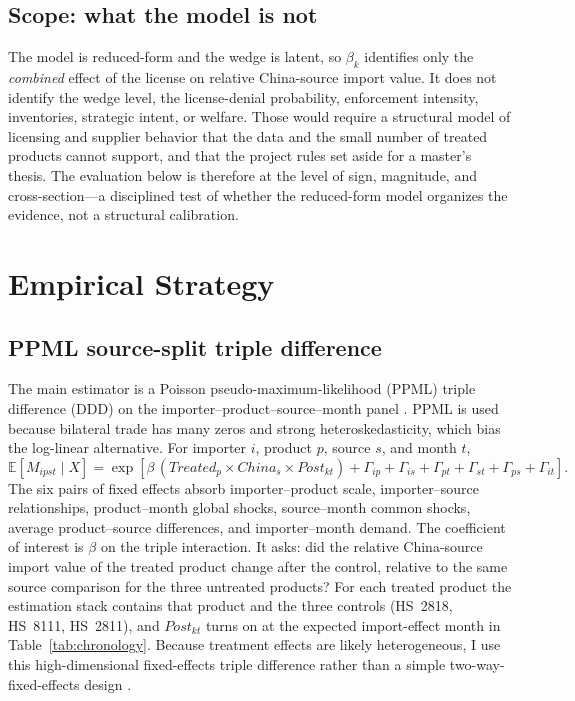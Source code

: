 \documentclass[12pt,a4paper]{article}
\begin{document}
\subsection{Scope: what the model is not}\label{sec:scope}

The model is reduced-form and the wedge is latent, so $\beta_k$ identifies only
the \emph{combined} effect of the license on relative China-source import value. It does not
identify the wedge level, the license-denial probability, enforcement intensity,
inventories, strategic intent, or welfare. Those would require a structural model
of licensing and supplier behavior that the data and the small number of treated
products cannot support, and that the project rules set aside for a master's
thesis. The evaluation below is therefore at the level of sign, magnitude, and
cross-section---a disciplined test of whether the reduced-form model organizes
the evidence, not a structural calibration.

\section{Empirical Strategy}\label{sec:strategy}

\subsection{PPML source-split triple difference}\label{sec:ddd}

The main estimator is a Poisson pseudo-maximum-likelihood (PPML) triple
difference (DDD) on the importer--product--source--month panel
\citep{santossilva2006gravity}. PPML is used because bilateral trade has many
zeros and strong heteroskedasticity, which bias the log-linear alternative. For
importer $i$, product $p$, source $s$, and month $t$,
\begin{equation}
\mathbb{E}[M_{ipst}\mid X]=
\exp\!\left[\beta\,(\mathit{Treated}_{p}\times \mathit{China}_{s}\times \mathit{Post}_{kt})
+\Gamma_{ip}+\Gamma_{is}+\Gamma_{pt}+\Gamma_{st}+\Gamma_{ps}+\Gamma_{it}\right].
\label{eq:ppml}
\end{equation}
The six pairs of fixed effects absorb importer--product scale, importer--source
relationships, product--month global shocks, source--month common shocks, average
product--source differences, and importer--month demand. The coefficient of
interest is $\beta$ on the triple interaction. It asks: did the relative
China-source import value of the treated product change after the control,
relative to the same
source comparison for the three untreated products? For each treated product the
estimation stack contains that product and the three controls (HS~2818, HS~8111,
HS~2811), and $\mathit{Post}_{kt}$ turns on at the expected import-effect month
in Table~\ref{tab:chronology}. Because treatment effects are likely
heterogeneous, I use this high-dimensional fixed-effects triple difference
rather than a simple two-way-fixed-effects design
\citep{dechaisemartindhaultfoeuille-2020-twowayfixedeffects}.
\end{document}
